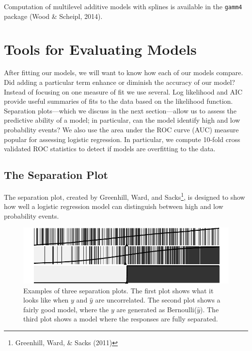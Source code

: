 \documentclass[12pt,twoside]{reedthesis}
\begin{document}
  Computation of multilevel additive models with splines is available in
  the \texttt{gamm4} package (Wood \& Scheipl, 2014).
  
  \section{Tools for Evaluating Models}\label{evaluate}
  
  After fitting our models, we will want to know how each of our models
  compare. Did adding a particular term enhance or diminish the accuracy
  of our model? Instead of focusing on one measure of fit we use several.
  Log likelihood and AIC provide useful summaries of fits to the data
  based on the likelihood function. Separation plots---which we discuss in
  the next section---allow us to assess the predictive ability of a model;
  in particular, can the model identify high and low probability events?
  We also use the area under the ROC curve (AUC) measure popular for
  assessing logistic regression. In particular, we compute 10-fold cross
  validated ROC statistics to detect if models are overfitting to the
  data.
  
  \subsection{The Separation Plot}\label{the-separation-plot}
  
  The separation plot, created by Greenhill, Ward, and Sacks\footnote{Greenhill,
    Ward, \& Sacks (2011)}, is designed to show how well a logistic
  regression model can distinguish between high and low probability
  events.
  
  \begin{figure}[tbh]
  \centering
  \includegraphics[angle = 0,scale = 1]{figure/sep_plot_examples.pdf}
  \caption[Examples of three separation plots]{\normalsize{Examples of three separation plots. The first plot shows
  what it looks like when $y$ and $\hat{y}$ are uncorrelated. The second plot 
  shows a fairly good model, where the $y$ are generated as Bernoulli($\hat{y}$).
  The third plot shows a model where the responses are fully separated.}}
  \label{fig:sep-plot-examples}
  \end{figure}
  
\end{document}
